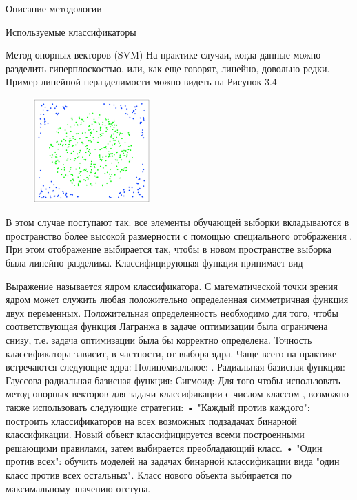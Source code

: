 \begin{section}{Описание методологии}
\begin{subsection}{Используемые классификаторы}
\begin{subsubsection}{Метод опорных векторов (SVM)}
На практике случаи, когда данные можно разделить гиперплоскостью, или, как еще говорят, линейно, довольно редки. Пример линейной неразделимости можно видеть на Рисунок 3.4

\begin{figure}[ht!]
\centering
\includegraphics[width=0.4\textwidth]{pics/SVM4}
\caption{}
\label{pic:SVM4}
\end{figure}

В этом случае поступают так: все элементы обучающей выборки вкладываются в пространство  более высокой размерности с помощью специального отображения . При этом отображение  выбирается так, чтобы в новом пространстве  выборка была линейно разделима.
Классифицирующая функция  принимает вид

Выражение  называется ядром классификатора. С математической точки зрения ядром может служить любая положительно определенная симметричная функция двух переменных. Положительная определенность необходимо для того, чтобы соответствующая функция Лагранжа в задаче оптимизации была ограничена снизу, т.е. задача оптимизации была бы корректно определена. Точность классификатора зависит, в частности, от выбора ядра.
Чаще всего на практике встречаются следующие ядра:
Полиномиальное: .
Радиальная базисная функция:
Гауссова радиальная базисная функция:
Сигмоид:
Для того чтобы использовать метод опорных векторов для задачи классификации с числом классом , возможно также использовать следующие стратегии:
•	"Каждый против каждого": построить  классификаторов на всех возможных подзадачах бинарной классификации. Новый объект классифицируется всеми построенными решающими правилами, затем выбирается преобладающий класс.
•	"Один против всех": обучить  моделей на задачах бинарной классификации вида "один класс против всех остальных". Класс нового объекта выбирается по максимальному значению отступа.


    \end{subsubsection}


\end{subsection}
\end{section}
